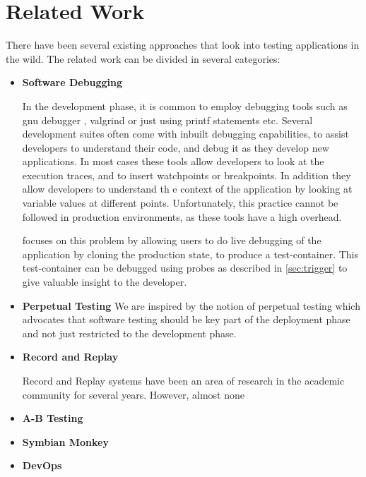 \section{Related Work}
\label{sec:related}

There have been several existing approaches that look into testing applications in the wild. 
The related work can be divided in several categories:

\begin{itemize}[leftmargin=*]
  
  \item \textbf{Software Debugging}
  
  In the development phase, it is common to employ debugging tools such as gnu debugger \cite{gdb}, valgrind \cite{valgrind} or just using printf statements etc.
  Several development suites\cite{eclipse, visual_studio, intel_suite} often come with inbuilt debugging capabilities, to assist developers to understand their code, and debug it as they develop new applications.
  In most cases these tools allow developers to look at the execution traces, and to insert watchpoints or breakpoints.
  In addition they allow developers to understand th      e context of the application by looking at variable values at different points.
  Unfortunately, this practice cannot be followed in production environments, as these tools have a high overhead.
  
  \parikshan focuses on this problem by allowing users to do live debugging of the application by cloning the production state, to produce a test-container.
  This test-container can be debugged using probes as described in \ref{sec:trigger} to give valuable insight to the developer.
  
    
  \item \textbf{Perpetual Testing}
     We are inspired by the notion of perpetual testing\cite{perpetual} which advocates that software testing should be key part of the deployment phase and not just restricted to the development phase.
  
  \item \textbf{Record and Replay}
  
  Record and Replay systems have been an area of research in the academic community for several years.
  However, almost none  
  
  \cite{altekar2009odr,dunlap2002revirt,guo2008r2, geels2007friday, laadan2010transparent}
  
  \item \textbf{A-B Testing}
  \item \textbf{Symbian Monkey}
   \item \textbf{DevOps}
\end{itemize}
  

